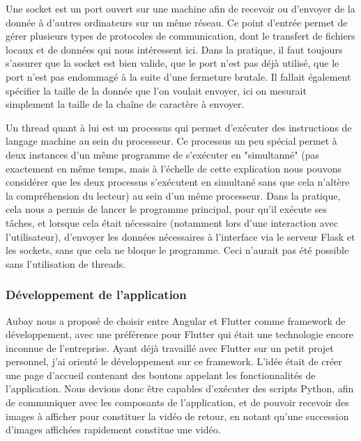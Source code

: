 \documentclass[11pt]{article}
\begin{document}
        Une socket est un port ouvert sur une machine afin de recevoir ou d'envoyer de la donnée à d'autres ordinateurs sur un même réseau. 
        Ce point d'entrée permet de gérer plusieurs types de protocoles de communication, dont le transfert de fichiers locaux et de données 
        qui nous intéressent ici. Dans la pratique, il faut toujours s'assurer que la socket est bien valide, que le port n'est pas déjà 
        utilisé, que le port n'est pas endommagé à la suite d'une fermeture brutale. Il fallait également spécifier la taille de la donnée que 
        l'on voulait envoyer, ici on mesurait simplement la taille de la chaîne de caractère à envoyer.     

        Un thread quant à lui est un processus qui permet d'exécuter des instructions de langage machine au sein du processeur. Ce 
        processus un peu spécial permet à deux instances d'un même programme de s'exécuter en "simultanné" (pas exactement en même temps, 
        mais à l'échelle de cette explication nous pouvons considérer que les deux processus s'exécutent en simultané sans que cela n'altère 
        la compréhension du lecteur) au sein d'un même processeur. Dans la pratique, cela nous a permis de lancer le programme principal, 
        pour qu'il exécute ses tâches, et lorsque cela était nécessaire (notamment lors d'une interaction avec l'utilisateur), d'envoyer 
        les données nécessaires à l'interface via le serveur Flask et les sockets, sans que cela ne bloque le programme. 
        Ceci n'aurait pas été possible sans l'utilisation de threads.    

      \subsubsection{Développement de l'application}      
        Aubay nous a proposé de choisir entre Angular et Flutter comme framework de 
        développement, avec une préférence pour Flutter qui était une technologie encore inconnue de l'entreprise. Ayant déjà travaillé 
        avec Flutter sur un petit projet personnel, j'ai orienté le développement sur ce framework. L'idée était de créer une page d'accueil 
        contenant des boutons appelant les fonctionnalités de l'application. Nous devions donc être capables d'exécuter des scripts Python, 
        afin de communiquer avec les composants de l'application,  et de pouvoir recevoir des images à afficher pour constituer la vidéo de 
        retour, en notant qu'une succession d'images affichées rapidement constitue une vidéo.
\end{document}
